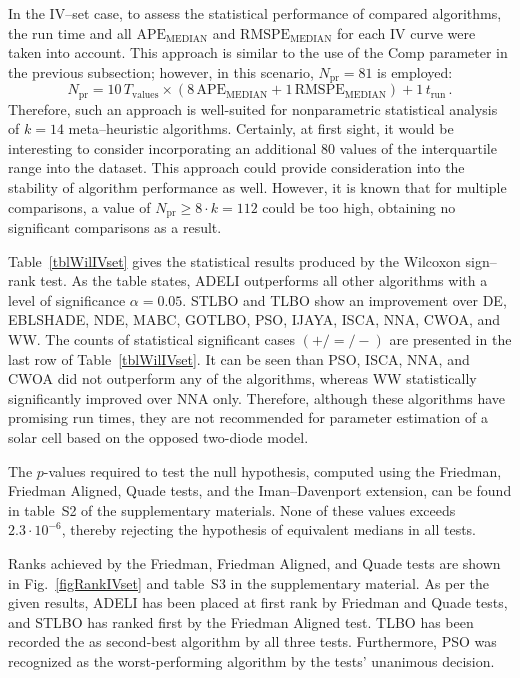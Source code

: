 \documentclass[a4paper,fleqn]{cas-sc}
\begin{document}
In the IV--set case, to assess the statistical performance of compared algorithms,
the run time and all $\mathrm{APE}_\mathrm{MEDIAN}$ and $\mathrm{RMSPE}_\mathrm{MEDIAN}$ for each IV curve were taken into account.
This approach is similar to the use of the Comp parameter in the previous subsection;
however, in this scenario, $N_\mathrm{pr}=81$ is employed:
\begin{equation*}
N_\mathrm{pr}= 10\,T_\mathrm{values}\times(8\,\mathrm{APE}_\mathrm{MEDIAN}+1\,\mathrm{RMSPE}_\mathrm{MEDIAN})+1\,t_\mathrm{run}\,.
\end{equation*}
Therefore, such an approach is well-suited for nonparametric statistical analysis of $k=14$ meta--heuristic algorithms.
Certainly, at first sight, it would be interesting to consider incorporating an additional 80 values of the interquartile range into the dataset.
This approach could provide consideration into the stability of algorithm performance as well.
However, it is known \cite{Derrac2011} that for multiple comparisons, a value of $N_\mathrm{pr}\geq 8\cdot k=112$ could be too high, obtaining
no significant comparisons as a result.

Table~\ref{tblWilIVset}  gives the statistical results produced by the Wilcoxon sign--rank test.
As the table states, ADELI outperforms all other algorithms with a level of significance $\alpha = 0.05$.
STLBO and TLBO show an improvement over
DE, EBLSHADE, NDE, MABC, GOTLBO, PSO, IJAYA, ISCA, NNA, CWOA, and WW.
The counts of statistical significant cases $(+/=/-)$ are presented in the last row of Table~\ref{tblWilIVset}.
It can be seen than PSO, ISCA, NNA, and CWOA did not outperform any of the algorithms,
whereas WW statistically significantly improved over  NNA only.
Therefore, although these algorithms have promising run times,
they are not recommended for parameter estimation of a solar cell based on the opposed two-diode model.

The $p$-values required to test the null hypothesis,
computed using the Friedman, Friedman Aligned, Quade tests, and the Iman--Davenport extension,
can be found in table~S2 of the supplementary materials.
None of these values exceeds $2.3\cdot10^{-6}$, thereby rejecting the hypothesis of equivalent medians in all tests.

Ranks achieved by the Friedman, Friedman Aligned, and Quade tests are shown in Fig.~\ref{figRankIVset} and table~S3 in the supplementary material.
As per the given results, ADELI has been placed at first rank by Friedman and Quade tests,
and STLBO has ranked first by the Friedman Aligned test.
TLBO has been recorded the as second-best algorithm by all three tests.
Furthermore, PSO was recognized as the worst-performing algorithm by the tests' unanimous decision.
\end{document}
